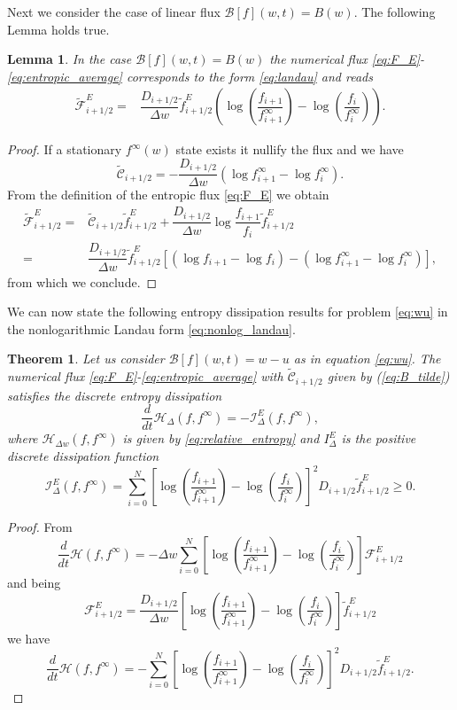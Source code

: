 \documentclass[a4paper]{article}
\newtheorem{lemma}{Lemma}
\newtheorem{theorem}{Theorem}
\theoremstyle{remark}\newtheorem{remark}{Remark}
\newcommand{\F}{\mathcal{F}}
\newcommand{\B}{\mathcal{B}}
\newcommand{\C}{\mathcal{C}}
\newcommand{\be}{\begin{equation}}
\newcommand{\ee}{\end{equation}}
\begin{document}
Next we consider the case of linear flux ${\B}[f](w,t)=B(w)$.
The following Lemma holds true.

\begin{lemma}\label{prop:1E}
In the case $\B[f](w,t)=B(w)$ the numerical flux \eqref{eq:F_E}-\eqref{eq:entropic_average} corresponds to the form \eqref{eq:landau} and reads
\be\begin{split}
\tilde{\F}^E_{i+1/2}=&\dfrac{D_{i+1/2}}{\Delta w} \tilde{f}^E_{i+1/2}  \left(\log \left(\dfrac{f_{i+1}}{f^{\infty}_{i+1}}\right)-\log \left(\dfrac{f_{i}}{f^{\infty}_{i}}\right)\right).
\end{split}\ee
\end{lemma}

\begin{proof}
If a stationary $f^{\infty}(w)$ state exists it nullify the flux and we have
\[
\tilde{\C}_{i+1/2} = -\dfrac{D_{i+1/2}}{\Delta w} \left( \log f^{\infty}_{i+1}-\log f^{\infty}_i\right).
\]
From the definition of the entropic flux \eqref{eq:F_E} we obtain
\[
\begin{split}
\tilde{\F}^E_{i+1/2}=& \tilde{\C}_{i+1/2}\tilde f^E_{i+1/2}+\dfrac{D_{i+1/2}}{\Delta w}\log \dfrac{f_{i+1}}{f_i}\tilde f^E_{i+1/2}\\
=& \dfrac{D_{i+1/2}}{\Delta w} \tilde{f}^E_{i+1/2} \left[ (\log f_{i+1}-\log f_i)-(\log f^{\infty}_{i+1}-\log f^{\infty}_i) \right],
\end{split}
\]
from which we conclude.
\end{proof}
We can now state the following entropy dissipation results for problem \eqref{eq:wu} in the nonlogarithmic Landau form \eqref{eq:nonlog_landau}.
\begin{theorem}\label{th:1b}
Let us consider $\B[f](w,t)=w-u$ as in equation \eqref{eq:wu}. The numerical flux \eqref{eq:F_E}-\eqref{eq:entropic_average} with $\tilde{\C}_{i+1/2}$ given by (\ref{eq:B_tilde}) satisfies the discrete entropy dissipation
\be
\dfrac{d}{dt} \mathcal H_{\Delta}(f,f^{\infty})  = -\mathcal I^E_{\Delta}(f,f^{\infty}),
\ee
where $\mathcal H_{\Delta w}(f,f^{\infty})$ is given by \eqref{eq:relative_entropy} and $I^E_{\Delta}$ is the positive discrete dissipation function 
\be
\mathcal I^E_{\Delta}(f,f^{\infty})= \sum_{i=0}^N \left[ \log \left(\dfrac{f_{i+1}}{f^{\infty}_{i+1}}\right) -\log \left(\dfrac{f_i}{f^{\infty}_i}\right) \right]^2 D_{i+1/2} \tilde f^E_{i+1/2}\ge 0.
\ee
\end{theorem}
\begin{proof}
From
\[
\dfrac{d}{dt} \mathcal H(f,f^{\infty}) = -\Delta w \sum_{i=0}^N \left[ \log \left(\dfrac{f_{i+1}}{f^{\infty}_{i+1}}\right) -\log \left(\dfrac{f_i}{f^{\infty}_i}\right) \right] \F^E_{i+1/2}
\]
and being 
\[
\F^E_{i+1/2} = \dfrac{D_{i+1/2}}{\Delta w}
\left[\log \left(\dfrac{f_{i+1}}{f_{i+1}^{\infty}}\right)-\log \left(\dfrac{f_i}{f_i^{\infty}}\right) \right]
\tilde{f}^{E}_{i+1/2}
\]
we have
\[
\dfrac{d}{dt} \mathcal H(f,f^{\infty}) = - \sum_{i=0}^N \left[ \log \left(\dfrac{f_{i+1}}{f^{\infty}_{i+1}}\right) -\log \left(\dfrac{f_i}{f^{\infty}_i}\right) \right]^2 D_{i+1/2} \tilde f^E_{i+1/2}.
\]
\end{proof} 
\end{document}
